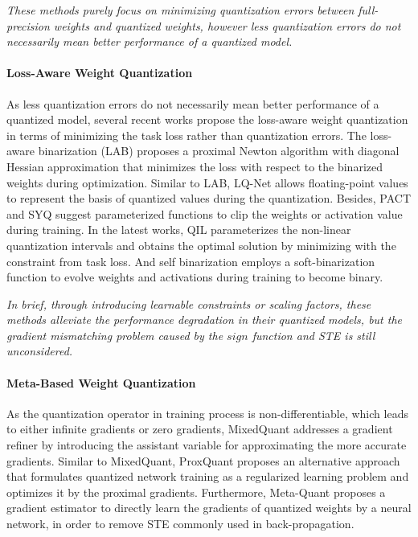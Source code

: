 \documentclass[runningheads]{llncs}
\begin{document}
\emph{These methods purely focus on
minimizing quantization errors between full-precision weights and quantized weights,
however less quantization errors do not necessarily mean better performance of a quantized model.}

\paragraph{\textbf{Loss-Aware Weight Quantization}}
As less quantization errors do not necessarily mean better performance of a quantized model,
several recent works propose the loss-aware weight quantization in terms of
minimizing the task loss rather than quantization errors.
The loss-aware binarization (LAB) \cite{hou2016loss} proposes
a proximal Newton algorithm with diagonal Hessian approximation that
minimizes the loss with respect to the binarized weights during optimization.
Similar to LAB, LQ-Net \cite{Zhang2018LQ}
allows floating-point values to represent the basis of quantized values during the quantization.
Besides, PACT \cite{pact2018} and SYQ \cite{Faraone2018syq}
suggest parameterized functions to clip the weights or activation value during training.
In the latest works, QIL \cite{jung2019learning} parameterizes the non-linear quantization intervals and
obtains the optimal solution by minimizing with the constraint from task loss.
And self binarization \cite{lahoud2019self} employs a soft-binarization function
to evolve weights and activations during training to become binary.

\emph{In brief, through introducing learnable constraints or scaling factors,
these methods alleviate the performance degradation in their quantized models,
but the gradient mismatching problem caused by the $sign$ function and STE \cite{alizadeh2019a} is still unconsidered.}

\paragraph{\textbf{Meta-Based Weight Quantization}}
As the quantization operator in training process is non-differentiable,
which leads to either infinite gradients or zero gradients,
MixedQuant \cite{Uhlich2019DQ} addresses a gradient refiner by introducing the assistant variable
for approximating the more accurate gradients.
Similar to MixedQuant, ProxQuant \cite{bai2019prox} proposes an alternative approach that
formulates quantized network training as a regularized learning problem
and optimizes it by the proximal gradients.
Furthermore, Meta-Quant \cite{chen2019meta} proposes a gradient estimator to directly
learn the gradients of quantized weights by a neural network,
in order to remove STE commonly used in back-propagation.
\end{document}
